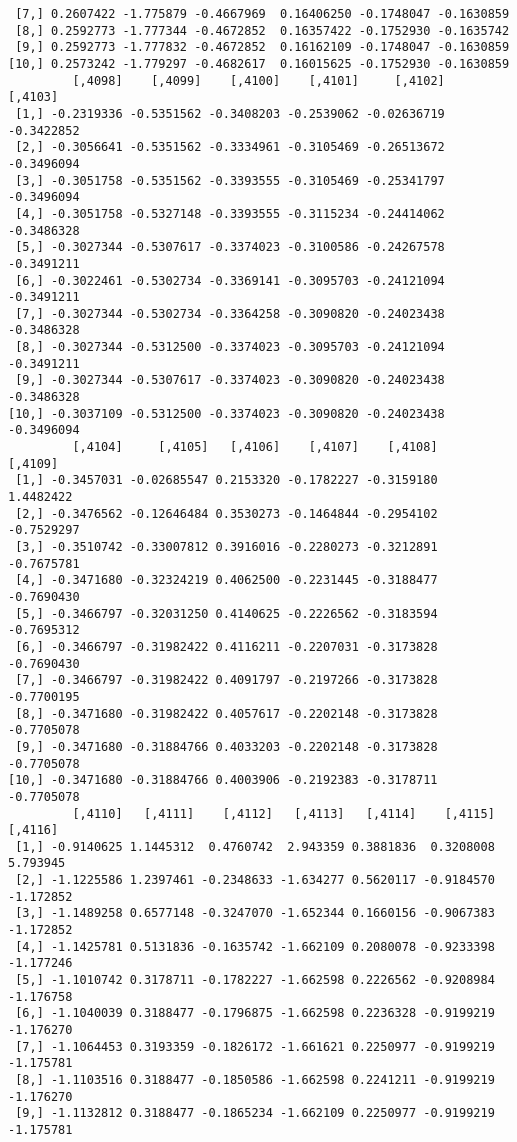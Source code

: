 \documentclass[
  letterpaper,
  DIV=11,
  numbers=noendperiod]{scrreprt}
\begin{document}
\begin{verbatim}
 [7,] 0.2607422 -1.775879 -0.4667969  0.16406250 -0.1748047 -0.1630859
 [8,] 0.2592773 -1.777344 -0.4672852  0.16357422 -0.1752930 -0.1635742
 [9,] 0.2592773 -1.777832 -0.4672852  0.16162109 -0.1748047 -0.1630859
[10,] 0.2573242 -1.779297 -0.4682617  0.16015625 -0.1752930 -0.1630859
         [,4098]    [,4099]    [,4100]    [,4101]     [,4102]    [,4103]
 [1,] -0.2319336 -0.5351562 -0.3408203 -0.2539062 -0.02636719 -0.3422852
 [2,] -0.3056641 -0.5351562 -0.3334961 -0.3105469 -0.26513672 -0.3496094
 [3,] -0.3051758 -0.5351562 -0.3393555 -0.3105469 -0.25341797 -0.3496094
 [4,] -0.3051758 -0.5327148 -0.3393555 -0.3115234 -0.24414062 -0.3486328
 [5,] -0.3027344 -0.5307617 -0.3374023 -0.3100586 -0.24267578 -0.3491211
 [6,] -0.3022461 -0.5302734 -0.3369141 -0.3095703 -0.24121094 -0.3491211
 [7,] -0.3027344 -0.5302734 -0.3364258 -0.3090820 -0.24023438 -0.3486328
 [8,] -0.3027344 -0.5312500 -0.3374023 -0.3095703 -0.24121094 -0.3491211
 [9,] -0.3027344 -0.5307617 -0.3374023 -0.3090820 -0.24023438 -0.3486328
[10,] -0.3037109 -0.5312500 -0.3374023 -0.3090820 -0.24023438 -0.3496094
         [,4104]     [,4105]   [,4106]    [,4107]    [,4108]    [,4109]
 [1,] -0.3457031 -0.02685547 0.2153320 -0.1782227 -0.3159180  1.4482422
 [2,] -0.3476562 -0.12646484 0.3530273 -0.1464844 -0.2954102 -0.7529297
 [3,] -0.3510742 -0.33007812 0.3916016 -0.2280273 -0.3212891 -0.7675781
 [4,] -0.3471680 -0.32324219 0.4062500 -0.2231445 -0.3188477 -0.7690430
 [5,] -0.3466797 -0.32031250 0.4140625 -0.2226562 -0.3183594 -0.7695312
 [6,] -0.3466797 -0.31982422 0.4116211 -0.2207031 -0.3173828 -0.7690430
 [7,] -0.3466797 -0.31982422 0.4091797 -0.2197266 -0.3173828 -0.7700195
 [8,] -0.3471680 -0.31982422 0.4057617 -0.2202148 -0.3173828 -0.7705078
 [9,] -0.3471680 -0.31884766 0.4033203 -0.2202148 -0.3173828 -0.7705078
[10,] -0.3471680 -0.31884766 0.4003906 -0.2192383 -0.3178711 -0.7705078
         [,4110]   [,4111]    [,4112]   [,4113]   [,4114]    [,4115]   [,4116]
 [1,] -0.9140625 1.1445312  0.4760742  2.943359 0.3881836  0.3208008  5.793945
 [2,] -1.1225586 1.2397461 -0.2348633 -1.634277 0.5620117 -0.9184570 -1.172852
 [3,] -1.1489258 0.6577148 -0.3247070 -1.652344 0.1660156 -0.9067383 -1.172852
 [4,] -1.1425781 0.5131836 -0.1635742 -1.662109 0.2080078 -0.9233398 -1.177246
 [5,] -1.1010742 0.3178711 -0.1782227 -1.662598 0.2226562 -0.9208984 -1.176758
 [6,] -1.1040039 0.3188477 -0.1796875 -1.662598 0.2236328 -0.9199219 -1.176270
 [7,] -1.1064453 0.3193359 -0.1826172 -1.661621 0.2250977 -0.9199219 -1.175781
 [8,] -1.1103516 0.3188477 -0.1850586 -1.662598 0.2241211 -0.9199219 -1.176270
 [9,] -1.1132812 0.3188477 -0.1865234 -1.662109 0.2250977 -0.9199219 -1.175781

\end{verbatim}
\end{document}
